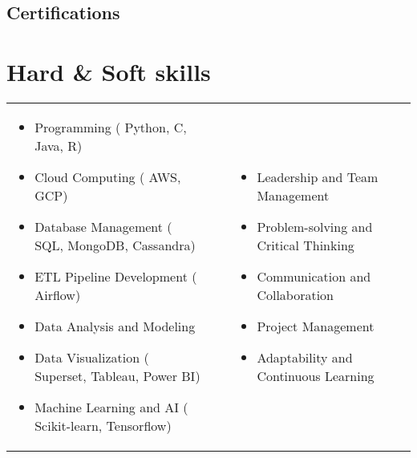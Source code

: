\documentclass[11pt, letterpaper, sans]{moderncv}
\begin{document}
\subsection{Certifications}

\section{Hard \& Soft skills}
{
    \center
    \begin{tabular}{p{0.5\linewidth}p{0.05\linewidth}p{0.45\linewidth}}
        \begin{itemize}
            \item Programming ({\color{color3} Python}, {\color{color3} C}, {\color{color3} Java}, {\color{color3} R})
            \item Cloud Computing ({\color{color3} AWS}, {\color{color3} GCP})
            \item Database Management ({\color{color3} SQL}, {\color{color3} MongoDB}, {\color{color3} Cassandra})
            \item ETL Pipeline Development ({\color{color3} Airflow})
            \item Data Analysis and Modeling
            \item Data Visualization ({\color{color3} Superset}, {\color{color3} Tableau}, {\color{color3} Power BI})
            \item Machine Learning and AI ({\color{color3} Scikit-learn}, {\color{color3} Tensorflow})
        \end{itemize}
        &
        & 
        \begin{itemize}
            \item Leadership and Team Management
            \item Problem-solving and Critical Thinking
            \item Communication and Collaboration
            \item Project Management
            \item Adaptability and Continuous Learning
        \end{itemize}
    \end{tabular}
}
\end{document}
